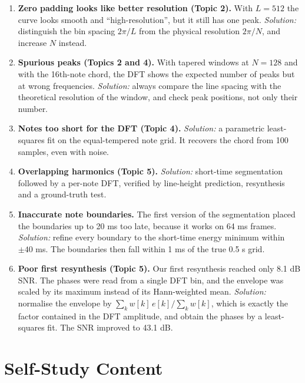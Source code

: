 \documentclass[12pt, a4paper]{article}
\begin{document}
\begin{enumerate}
    \item \textbf{Zero padding looks like better resolution (Topic 2).} With $L=512$ the curve looks smooth and ``high-resolution'', but it still has one peak. \emph{Solution:} distinguish the bin spacing $2\pi/L$ from the physical resolution $2\pi/N$, and increase $N$ instead.
    \item \textbf{Spurious peaks (Topics 2 and 4).} With tapered windows at $N=128$ and with the 16th-note chord, the DFT shows the expected number of peaks but at wrong frequencies. \emph{Solution:} always compare the line spacing with the theoretical resolution of the window, and check peak positions, not only their number.
    \item \textbf{Notes too short for the DFT (Topic 4).} \emph{Solution:} a parametric least-squares fit on the equal-tempered note grid. It recovers the chord from 100 samples, even with noise.
    \item \textbf{Overlapping harmonics (Topic 5).} \emph{Solution:} short-time segmentation followed by a per-note DFT, verified by line-height prediction, resynthesis and a ground-truth test.
    \item \textbf{Inaccurate note boundaries.} The first version of the segmentation placed the boundaries up to 20 ms too late, because it works on 64 ms frames. \emph{Solution:} refine every boundary to the short-time energy minimum within $\pm40$ ms. The boundaries then fall within 1 ms of the true 0.5 s grid.
    \item \textbf{Poor first resynthesis (Topic 5).} Our first resynthesis reached only 8.1 dB SNR. The phases were read from a single DFT bin, and the envelope was scaled by its maximum instead of its Hann-weighted mean. \emph{Solution:} normalise the envelope by $\sum_k w[k]\,e[k]/\sum_kw[k]$, which is exactly the factor contained in the DFT amplitude, and obtain the phases by a least-squares fit. The SNR improved to 43.1 dB.
\end{enumerate}

\section{Self-Study Content}
\end{document}
